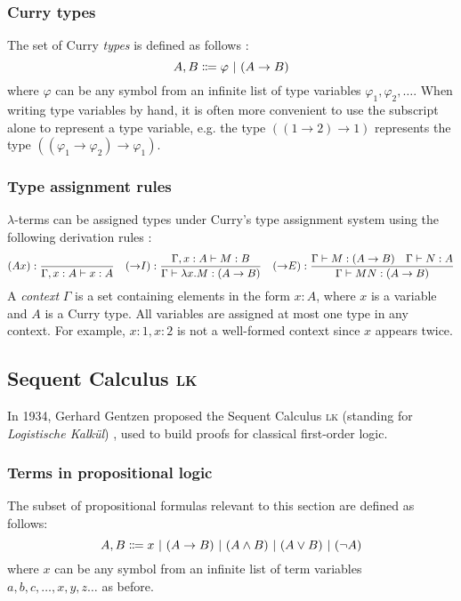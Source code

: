 \subsubsection{Curry types}
\label{lambda:curry-types}
The set of Curry \textit{types} is defined as follows \cite{van-bakel:2022}:
\[
    A, B \Coloneqq \varphi \ |\  (A \rightarrow B)
\]
where $\varphi$ can be any symbol from an infinite list of type variables $\varphi_1, \varphi_2, \ldots$. When writing type variables by hand, it is often more convenient to use the subscript alone to represent a type variable, e.g. the type $((1 \rightarrow 2) \rightarrow 1)$ represents the type $((\varphi_1 \rightarrow \varphi_2) \rightarrow \varphi_1)$.

\subsubsection{Type assignment rules}
\label{lambda:type-assignment}
$\lambda$-terms can be assigned types under Curry's type assignment system using the following derivation rules \cite{van-bakel:2022}:
{
    \derivationfont
    \[
        (Ax): \frac{}{\Gamma, x:A \vdash x:A} \quad (\mathord{\to} I): \frac{\Gamma, x:A \vdash M:B}{\Gamma \vdash \lambda x. M: (A \to B)} \quad (\mathord{\to} E): \frac{\Gamma \vdash M: (A \to B) \quad \Gamma \vdash N: A}{\Gamma \vdash MN: (A \to B)}
    \]
}%
A \textit{context} $\Gamma$ is a set containing elements in the form $x:A$, where $x$ is a variable and $A$ is a Curry type. All variables are assigned at most one type in any context. For example, $x:1, x:2$ is not a well-formed context since $x$ appears twice.

\subsection{Sequent Calculus \textsc{lk}}
In 1934, Gerhard Gentzen proposed the Sequent Calculus \textsc{lk} (standing for \textit{Logistische Kalkül}) \cite{gentzen:1969}, used to build proofs for classical first-order logic.

\subsubsection{Terms in propositional logic}
The subset of propositional formulas relevant to this section are defined as follows:
\[
    A, B \Coloneqq x \ |\  (A \to B) \ |\  (A \land B) \ |\  (A \lor B) \ |\  (\lnot A)
\]
where $x$ can be any symbol from an infinite list of term variables $a, b, c, \ldots, x, y, z \ldots$ as before.

